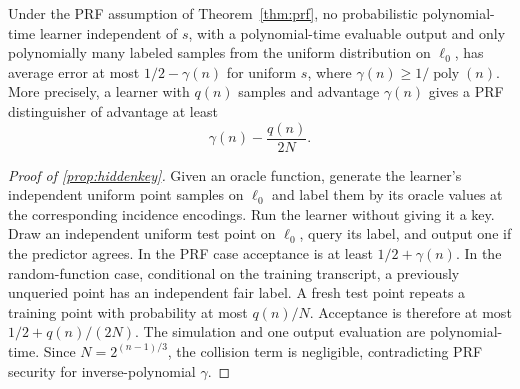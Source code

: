 \begin{proposition}\label{prop:hiddenkey}
Under the PRF assumption of Theorem~\ref{thm:prf}, no probabilistic polynomial-time learner independent of $s$, with a polynomial-time evaluable output and only polynomially many labeled samples from the uniform distribution on $\ell_0$, has average error at most $1/2-\gamma(n)$ for uniform $s$, where $\gamma(n)\ge1/\operatorname{poly}(n)$. More precisely, a learner with $q(n)$ samples and advantage $\gamma(n)$ gives a PRF distinguisher of advantage at least
\[
 \gamma(n)-\frac{q(n)}{2N}.
\]
\end{proposition}

\begin{proof}[Proof of \cref{prop:hiddenkey}]
Given an oracle function, generate the learner's independent uniform point samples on $\ell_0$ and label them by its oracle values at the corresponding incidence encodings. Run the learner without giving it a key. Draw an independent uniform test point on $\ell_0$, query its label, and output one if the predictor agrees. In the PRF case acceptance is at least $1/2+\gamma(n)$. In the random-function case, conditional on the training transcript, a previously unqueried point has an independent fair label. A fresh test point repeats a training point with probability at most $q(n)/N$. Acceptance is therefore at most $1/2+q(n)/(2N)$. The simulation and one output evaluation are polynomial-time. Since $N=2^{(n-1)/3}$, the collision term is negligible, contradicting PRF security for inverse-polynomial $\gamma$.
\end{proof}
